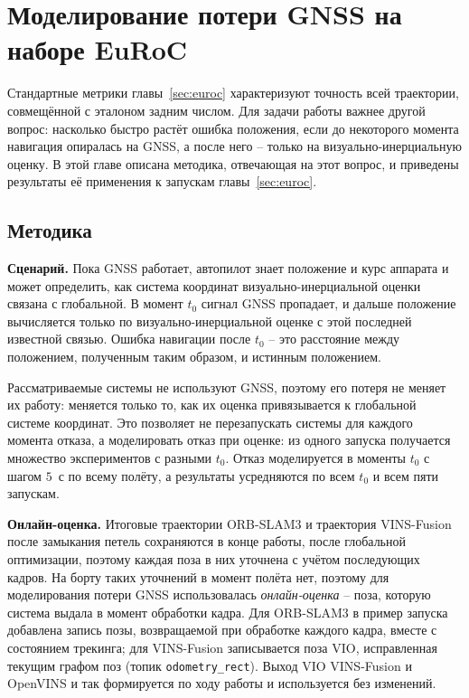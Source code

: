     \section{Моделирование потери GNSS на наборе EuRoC}\label{sec:gnss_loss}

    Стандартные метрики главы~\ref{sec:euroc} характеризуют точность всей траектории, совмещённой с эталоном задним числом.
    Для задачи работы важнее другой вопрос: насколько быстро растёт ошибка положения, если до некоторого момента навигация опиралась на GNSS, а после него -- только на визуально-инерциальную оценку.
    В этой главе описана методика, отвечающая на этот вопрос, и приведены результаты её применения к запускам главы~\ref{sec:euroc}.

    \subsection{Методика}

    \textbf{Сценарий.}
    Пока GNSS работает, автопилот знает положение и курс аппарата и может определить, как система координат визуально-инерциальной оценки связана с глобальной.
    В момент $t_0$ сигнал GNSS пропадает, и дальше положение вычисляется только по визуально-инерциальной оценке с этой последней известной связью.
    Ошибка навигации после $t_0$ -- это расстояние между положением, полученным таким образом, и истинным положением.

    Рассматриваемые системы не используют GNSS, поэтому его потеря не меняет их работу: меняется только то, как их оценка привязывается к глобальной системе координат.
    Это позволяет не перезапускать системы для каждого момента отказа, а моделировать отказ при оценке: из одного запуска получается множество экспериментов с разными $t_0$.
    Отказ моделируется в моменты $t_0$ с шагом $5$~с по всему полёту, а результаты усредняются по всем $t_0$ и всем пяти запускам.

    \textbf{Онлайн-оценка.}
    Итоговые траектории ORB-SLAM3 и траектория VINS-Fusion после замыкания петель сохраняются в конце работы, после глобальной оптимизации, поэтому каждая поза в них уточнена с учётом последующих кадров.
    На борту таких уточнений в момент полёта нет, поэтому для моделирования потери GNSS использовалась \emph{онлайн-оценка} -- поза, которую система выдала в момент обработки кадра.
    Для ORB-SLAM3 в пример запуска добавлена запись позы, возвращаемой при обработке каждого кадра, вместе с состоянием трекинга; для VINS-Fusion записывается поза VIO, исправленная текущим графом поз (топик \texttt{odometry\_rect}).
    Выход VIO VINS-Fusion и OpenVINS и так формируется по ходу работы и используется без изменений.

